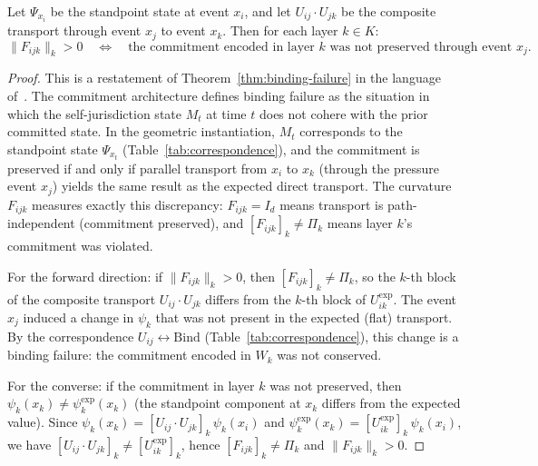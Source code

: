 \begin{theorem}
\label{thm:curvature-binding}
Let $\Psi_{x_i}$ be the standpoint state at event $x_i$, and let $U_{ij} \cdot U_{jk}$ be
the composite transport through event $x_j$ to event $x_k$. Then for each layer $k \in K$:
\[
    \|F_{ijk}\|_k > 0 \quad\Longleftrightarrow\quad \text{the commitment encoded in
    layer $k$ was not preserved through event $x_j$.}
\]
\end{theorem}

\begin{proof}
This is a restatement of Theorem~\ref{thm:binding-failure} in the language
of~\cite{self-jurisdiction}. The commitment architecture defines binding failure as the
situation in which the self-jurisdiction state $M_t$ at time $t$ does not cohere with the
prior committed state. In the geometric instantiation, $M_t$ corresponds to the standpoint
state $\Psi_{x_t}$ (Table~\ref{tab:correspondence}), and the commitment is preserved if
and only if parallel transport from $x_i$ to $x_k$ (through the pressure event $x_j$)
yields the same result as the expected direct transport. The curvature $F_{ijk}$ measures
exactly this discrepancy: $F_{ijk} = I_d$ means transport is path-independent (commitment
preserved), and $[F_{ijk}]_k \neq \Pi_k$ means layer $k$'s commitment was violated.

For the forward direction: if $\|F_{ijk}\|_k > 0$, then $[F_{ijk}]_k \neq \Pi_k$,
so the $k$-th block of the composite transport $U_{ij} \cdot U_{jk}$ differs from the
$k$-th block of $U_{ik}^{\exp}$. The event $x_j$ induced a change in $\psi_k$ that was
not present in the expected (flat) transport. By the correspondence $U_{ij} \leftrightarrow
\mathrm{Bind}$ (Table~\ref{tab:correspondence}), this change is a binding failure: the
commitment encoded in $W_k$ was not conserved.

For the converse: if the commitment in layer $k$ was not preserved, then $\psi_k(x_k)
\neq \psi_k^{\exp}(x_k)$ (the standpoint component at $x_k$ differs from the expected
value). Since $\psi_k(x_k) = [U_{ij} \cdot U_{jk}]_k\, \psi_k(x_i)$ and
$\psi_k^{\exp}(x_k) = [U_{ik}^{\exp}]_k\, \psi_k(x_i)$, we have $[U_{ij} \cdot U_{jk}]_k
\neq [U_{ik}^{\exp}]_k$, hence $[F_{ijk}]_k \neq \Pi_k$ and $\|F_{ijk}\|_k > 0$.
\end{proof}

